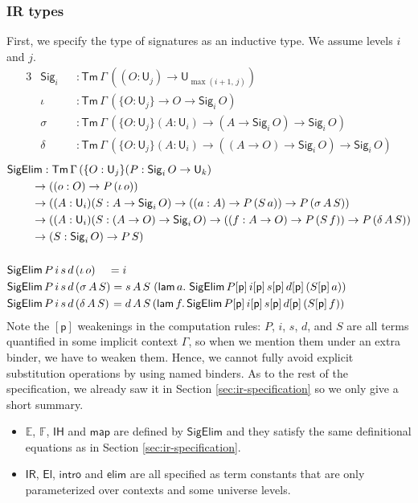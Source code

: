 \documentclass[acmsmall,screen,review]{acmart}
\newcommand{\msf}[1]{{\mathsf{#1}}}
\newcommand{\mbb}[1]{\mathbb{#1}}
\newcommand{\p}{\mathsf{p}}
\newcommand{\U}{\msf{U}}
\newcommand{\El}{\msf{El}}
\newcommand{\Sig}{\msf{Sig}}
\newcommand{\IR}{\msf{IR}}
\newcommand{\intro}{\msf{intro}}
\newcommand{\IH}{\msf{IH}}
\newcommand{\map}{\msf{map}}
\newcommand{\elim}{\msf{elim}}
\newcommand{\Tm}{\msf{Tm}}
\newcommand{\lam}{\msf{lam}}
\newcommand{\SigElim}{\msf{SigElim}}
\newcommand{\E}{\mbb{E}}
\newcommand{\F}{\mbb{F}}
\begin{document}
\subsubsection{IR types} First, we specify the type of signatures as an inductive type. We assume levels $i$
and $j$.
\begin{alignat*}{3}
  &\Sig_i  &&: \Tm\,\Gamma\,((O : \U_j) \to \U_{\max(i+1,\,j)})\\
  &\iota   &&: \Tm\,\Gamma\,(\{O : \U_j\} \to O \to \Sig_i\,O)\\
  &\sigma  &&: \Tm\,\Gamma\,(\{O : \U_j\}(A : \U_i) \to (A \to \Sig_i\,O) \to \Sig_i\,O)\\
  &\delta  &&: \Tm\,\Gamma\,(\{O : \U_j\}(A : \U_i) \to ((A \to O) \to \Sig_i\,O) \to \Sig_i\,O)
\end{alignat*}
\begin{alignat*}{3}
  &\SigElim : \Tm\,\Gamma\,(\{O : \U_j\}(P : \Sig_i\,O \to \U_k)\\
  &           \hspace{2.2em}\to ((o : O) \to P\,(\iota\,o))\\
  &           \hspace{2.2em}\to ((A : \U_i)(S : A \to \Sig_i\,O) \to ((a : A) \to P\,(S\,a)) \to P\,(\sigma\,A\,S))\\
  &           \hspace{2.2em}\to ((A : \U_i)(S : (A \to O) \to \Sig_i\,O) \to ((f : A \to O) \to P\,(S\,f)) \to P\,(\delta\,A\,S))\\
  &           \hspace{2.2em}\to (S : \Sig_i\,O) \to P\,S)\\
  &\\
  &\SigElim\,P\,i\,s\,d\,(\iota\,o) \hspace{1.1em} = i\\
  &\SigElim\,P\,i\,s\,d\,(\sigma\,A\,S) = s\,A\,S\hspace{0.3em}(\lam\,a.\hspace{0.3em}\SigElim\,P[\p]\,i[\p]\,s[\p]\,d[\p]\,(S[\p]\,a))\\
  &\SigElim\,P\,i\,s\,d\,(\delta\,A\,S) \hspace{0.1em}= d\,A\,S\,(\lam\,f.\,\SigElim\,P[\p]\,i[\p]\,s[\p]\,d[\p]\,(S[\p]\,f))
\end{alignat*}
Note the $[\p]$ weakenings in the computation rules: $P$, $i$, $s$, $d$, and $S$ are all terms
quantified in some implicit context $\Gamma$, so when we mention them under an extra binder, we have
to weaken them. Hence, we cannot fully avoid explicit substitution operations by using named
binders. As to the rest of the specification, we already saw it in Section
\ref{sec:ir-specification} so we only give a short summary.
\begin{itemize}
\item $\E$, $\F$, $\IH$ and $\map$ are defined by $\SigElim$ and they satisfy the same definitional
  equations as in Section \ref{sec:ir-specification}.
\item $\IR$, $\El$, $\intro$ and $\elim$ are all specified as term constants that are only parameterized over contexts and some universe levels.
\end{itemize}
\end{document}
